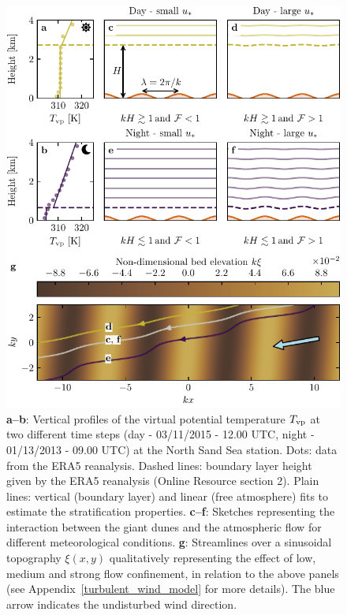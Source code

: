 \begin{figure}
\centering
\includegraphics[scale=1]{Figures/Figure7.pdf}
\caption{\textbf{a--b}: Vertical profiles of the virtual potential temperature $T_{\rm vp}$ at two different time steps (day - 03/11/2015 - 12.00 UTC, night - 01/13/2013 - 09.00 UTC) at the North Sand Sea station. Dots: data from the ERA5 reanalysis. Dashed lines: boundary layer height given by the ERA5 reanalysis (Online Resource section 2). Plain lines: vertical (boundary layer) and linear (free atmosphere) fits to estimate the stratification properties. \textbf{c--f}: Sketches representing the interaction between the giant dunes and the atmospheric flow for different meteorological conditions. \textbf{g}: Streamlines over a sinusoidal topography $\xi(x,y)$ qualitatively representing the effect of low, medium and strong flow confinement, in relation to the above panels (see Appendix~\ref{turbulent_wind_model} for more details). The blue arrow indicates the undisturbed wind direction.}
\label{Fig7}
\end{figure}


